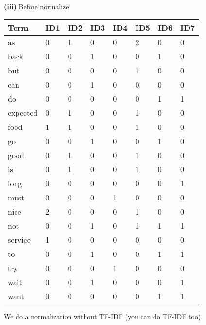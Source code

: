 \documentclass[11pt,a4paper]{report}
\begin{document}
\begin{multicols*}{2}
\noindent \textbf{(iii)} Before normalize
\scriptsize
\begin{center}
\begin{tabular}{| l | l l l l l l l |}
\hline
Term     & ID1 & ID2 & ID3 & ID4 & ID5 & ID6 & ID7 \\ \hline
as       & 0   & 1   & 0   & 0   & 2   & 0   & 0   \\
back     & 0   & 0   & 1   & 0   & 0   & 1   & 0   \\
but      & 0   & 0   & 0   & 0   & 1   & 0   & 0   \\
can      & 0   & 0   & 1   & 0   & 0   & 0   & 0   \\
do       & 0   & 0   & 0   & 0   & 0   & 1   & 1   \\
expected & 0   & 1   & 0   & 0   & 1   & 0   & 0   \\
food     & 1   & 1   & 0   & 0   & 1   & 0   & 0   \\
go       & 0   & 0   & 1   & 0   & 0   & 1   & 0   \\
good     & 0   & 1   & 0   & 0   & 1   & 0   & 0   \\
is       & 0   & 1   & 0   & 0   & 1   & 0   & 0   \\
long     & 0   & 0   & 0   & 0   & 0   & 0   & 1   \\
must     & 0   & 0   & 0   & 1   & 0   & 0   & 0   \\
nice     & 2   & 0   & 0   & 0   & 1   & 0   & 0   \\
not      & 0   & 0   & 1   & 0   & 1   & 1   & 1   \\
service  & 1   & 0   & 0   & 0   & 0   & 0   & 0   \\
to       & 0   & 0   & 1   & 0   & 0   & 1   & 1   \\
try      & 0   & 0   & 0   & 1   & 0   & 0   & 0   \\
wait     & 0   & 0   & 1   & 0   & 0   & 0   & 1   \\
want     & 0   & 0   & 0   & 0   & 0   & 1   & 1   \\ \hline
\end{tabular}
\end{center}
\normalsize

\noindent We do a normalization without TF-IDF (you can do TF-IDF too).


\end{multicols*}
\end{document}
